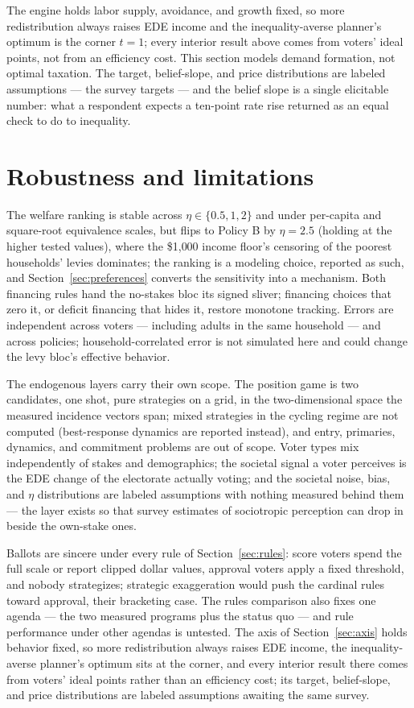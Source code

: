 \documentclass[11pt]{article}
\begin{document}
The engine holds labor supply, avoidance, and growth fixed, so more
redistribution always raises EDE income and the inequality-averse
planner's optimum is the corner \(t = 1\); every interior result above
comes from voters' ideal points, not from an efficiency cost. This
section models demand formation, not optimal taxation. The target,
belief-slope, and price distributions are labeled assumptions --- the
survey targets --- and the belief slope is a single elicitable number:
what a respondent expects a ten-point rate rise returned as an equal
check to do to inequality.

\section{Robustness and limitations}\label{sec:limits}

The welfare ranking is stable across \(\eta \in \{0.5, 1, 2\}\) and under
per-capita and square-root equivalence scales, but flips to Policy B by
\(\eta = 2.5\) (holding at the higher tested values), where the
\$1{,}000 income floor's censoring of the
poorest households' levies dominates; the ranking is a modeling choice,
reported as such, and Section~\ref{sec:preferences} converts the
sensitivity into a mechanism. Both financing rules hand the no-stakes
bloc its signed sliver; financing choices that zero it, or deficit
financing that hides it, restore monotone tracking. Errors are
independent across voters --- including adults in the same household ---
and across policies; household-correlated error is not simulated here
and could change the levy bloc's effective behavior.

The endogenous layers carry their own scope. The position game is two
candidates, one shot, pure strategies on a grid, in the
two-dimensional space the measured incidence vectors span; mixed
strategies in the cycling regime are not computed (best-response
dynamics are reported instead), and entry, primaries, dynamics, and
commitment problems are out of scope. Voter types mix independently of
stakes and demographics; the societal signal a voter perceives is the
EDE change of the electorate actually voting; and the societal noise,
bias, and \(\eta\) distributions are labeled assumptions with nothing
measured behind them --- the layer exists so that survey estimates of
sociotropic perception can drop in beside the own-stake ones.

Ballots are sincere under every rule of Section~\ref{sec:rules}: score
voters spend the full scale or report clipped dollar values, approval
voters apply a fixed threshold, and nobody strategizes; strategic
exaggeration would push the cardinal rules toward approval, their
bracketing case. The rules comparison also fixes one agenda --- the
two measured programs plus the status quo --- and rule performance
under other agendas is untested. The axis of Section~\ref{sec:axis}
holds behavior fixed, so more redistribution always raises EDE income,
the inequality-averse planner's optimum sits at the corner, and every
interior result there comes from voters' ideal points rather than an
efficiency cost; its target, belief-slope, and price distributions are
labeled assumptions awaiting the same survey.
\end{document}
